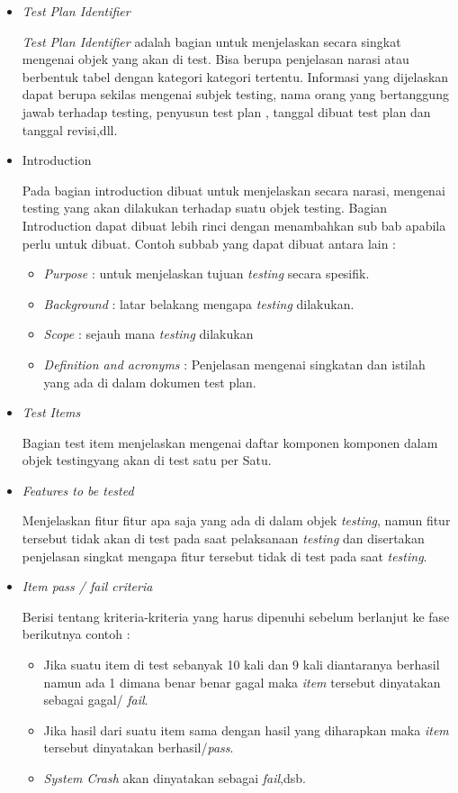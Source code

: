 \begin{itemize}
	\itemsep0em
	\item \textit{Test Plan Identifier}
	\par \textit{Test Plan Identifier} adalah bagian untuk menjelaskan secara singkat mengenai objek yang akan di test. Bisa berupa penjelasan narasi atau berbentuk tabel dengan kategori kategori tertentu. Informasi yang dijelaskan dapat berupa sekilas mengenai subjek testing, nama orang yang bertanggung jawab terhadap testing, penyusun test plan , tanggal dibuat test plan dan tanggal revisi,dll.
	
	\item Introduction
	\par Pada bagian introduction dibuat untuk menjelaskan secara narasi, mengenai testing yang akan dilakukan terhadap suatu objek testing. Bagian Introduction dapat dibuat lebih rinci dengan menambahkan sub bab apabila perlu untuk dibuat. Contoh subbab yang dapat dibuat antara lain :
	\begin{itemize}
		\itemsep0em
		\item \textit{Purpose} : untuk menjelaskan tujuan \textit{testing}  secara spesifik.
		\item \textit{Background} : latar belakang mengapa \textit{testing} dilakukan.
		\item \textit{Scope} : sejauh mana \textit{testing} dilakukan
		\item \textit{Definition and acronyms} : Penjelasan mengenai singkatan dan istilah yang ada di dalam dokumen test plan.
	\end{itemize}
	
	\item \textit{Test Items}
	\par Bagian test item menjelaskan mengenai daftar komponen komponen dalam objek testingyang akan di test satu per Satu.
	
	\item \textit{Features to be tested}
	\par Menjelaskan fitur fitur apa saja yang ada di dalam objek \textit{testing}, namun fitur tersebut tidak akan di test pada saat pelaksanaan \textit{testing} dan disertakan penjelasan singkat mengapa fitur tersebut tidak di test pada saat \textit{testing}.
	
	\item \textit{Item pass / fail criteria}
	\par Berisi tentang kriteria-kriteria yang harus dipenuhi sebelum berlanjut ke fase berikutnya contoh :
	\begin{itemize}
		\itemsep0em
		\item Jika suatu item di test sebanyak 10 kali dan 9 kali diantaranya berhasil namun ada 1 dimana benar benar gagal maka \textit{item} tersebut dinyatakan sebagai gagal/ \textit{fail}.
		\item Jika hasil dari suatu item sama dengan hasil yang diharapkan maka \textit{item} tersebut dinyatakan berhasil/\textit{pass}.
		\item \textit{System Crash} akan dinyatakan sebagai \textit{fail},dsb.
	\end{itemize}
	

\end{itemize}
